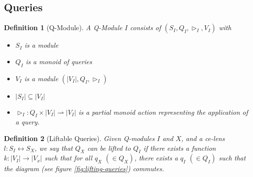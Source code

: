 \documentclass[a4paper,10pt]{article}
\newtheorem{definition}{Definition}
\begin{document}
\subsection{Queries}
\begin{definition}[Q-Module] A Q-Module $I$ consists of $(S_I,Q_I,\rhd_I, V_I)$ with
\begin{itemize}
\item $S_I$ is a module
\item $Q_I$ is a monoid of queries
\item $V_I$ is a module $(|V_I|,Q_I,\rhd_I)$
\item $|S_I| \subseteq |V_I|$
\item $\rhd_{I} : Q_I \times |V_I| \rightharpoonup |V_I|$ is a partial monoid action representing the application of a query.


\end{itemize}
\end{definition} 

\begin{definition}[Liftable Queries]
Given Q-modules $I$ and $X$, and a ce-lens $l : S_I \leftrightarrow S_X$, we say that $Q_X$ can be lifted to $Q_I$ if there exists a function $k : |V_I| \to |V_x|$ such that for all $q_X$ $(\in Q_X)$, there exists a $q_I$ $(\in Q_I)$ such that the diagram (see figure \ref{fig:lifting-queries}) commutes.
\end{definition}
\end{document}
